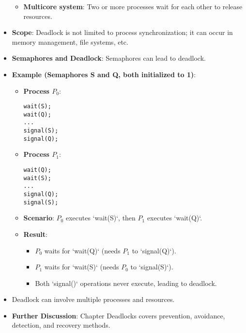 \begin{itemize}
\begin{itemize}
        \item \textbf{Multicore system}: Two or more processes wait for each other to release resources.
    \end{itemize}
    \item \textbf{Scope}: Deadlock is not limited to process synchronization; it can occur in memory management, file systems, etc.
    \item \textbf{Semaphores and Deadlock}: Semaphores can lead to deadlock.
    \item \textbf{Example (Semaphores S and Q, both initialized to 1)}:
    \begin{itemize}
        \item \textbf{Process $P_0$}:
\begin{verbatim}
wait(S);
wait(Q);
...
signal(S);
signal(Q);
\end{verbatim}
        \item \textbf{Process $P_1$}:
\begin{verbatim}
wait(Q);
wait(S);
...
signal(Q);
signal(S);
\end{verbatim}
        \item \textbf{Scenario}: $P_0$ executes `wait(S)`, then $P_1$ executes `wait(Q)`.
        \item \textbf{Result}:
        \begin{itemize}
            \item $P_0$ waits for `wait(Q)` (needs $P_1$ to `signal(Q)`).
            \item $P_1$ waits for `wait(S)` (needs $P_0$ to `signal(S)`).
            \item Both `signal()` operations never execute, leading to deadlock.
        \end{itemize}
    \end{itemize}
    \item Deadlock can involve multiple processes and resources.
    \item \textbf{Further Discussion}: Chapter Deadlocks covers prevention, avoidance, detection, and recovery methods.


\end{itemize}
